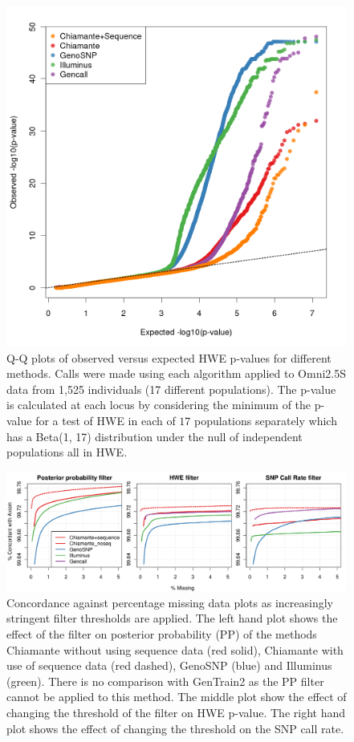 \begin{figure}
\centering
    \includegraphics[width=.5\textwidth]{chap2figs/Fig3}
    \caption[Q-Q plots of HWE p-values for different genotype calling methods]{Q-Q plots of observed versus expected HWE p-values for different methods. Calls were made using each algorithm applied to Omni2.5S data from 1,525 individuals (17 different populations). The p-value is calculated at each locus by considering the minimum of the p-value for a test of HWE in each of $17$ populations separately which has a Beta(1, 17) distribution under the null of independent populations all in HWE.
      \label{seq1,525qq}}
\end{figure}

\begin{figure}
  \begin{center} 
    \includegraphics[width=\textwidth]{chap2figs/Fig2}
    \caption[Concordance against missingness for increasingly stringent QC filters]{Concordance against percentage missing data plots as increasingly stringent filter thresholds are applied. The left hand plot shows the effect of the filter on posterior probability (PP) of the methods Chiamante without using sequence data (red solid), Chiamante with use of sequence data (red dashed), GenoSNP (blue) and Illuminus (green). There is no comparison with GenTrain2 as the PP filter cannot be applied to this method. The middle plot show the effect of changing the threshold of the filter on HWE p-value. The right hand plot shows the effect of changing the threshold on the SNP call rate.\label{arrayfig}}
  \end{center} 
\end{figure}

